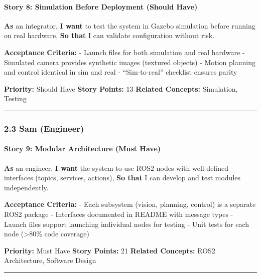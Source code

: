 \documentclass[
]{article}
\begin{document}
\hypertarget{story-8-simulation-before-deployment-should-have}{%
\paragraph{Story 8: Simulation Before Deployment (Should
Have)}\label{story-8-simulation-before-deployment-should-have}}

\textbf{As} an integrator, \textbf{I want} to test the system in Gazebo
simulation before running on real hardware, \textbf{So that} I can
validate configuration without risk.

\textbf{Acceptance Criteria:} - Launch files for both simulation and
real hardware - Simulated camera provides synthetic images (textured
objects) - Motion planning and control identical in sim and real -
``Sim-to-real'' checklist ensures parity

\textbf{Priority:} Should Have \textbf{Story Points:} 13 \textbf{Related
Concepts:} Simulation, Testing

\begin{center}\rule{0.5\linewidth}{0.5pt}\end{center}

\hypertarget{sam-engineer}{%
\subsubsection{2.3 Sam (Engineer)}\label{sam-engineer}}

\hypertarget{story-9-modular-architecture-must-have}{%
\paragraph{Story 9: Modular Architecture (Must
Have)}\label{story-9-modular-architecture-must-have}}

\textbf{As} an engineer, \textbf{I want} the system to use ROS2 nodes
with well-defined interfaces (topics, services, actions), \textbf{So
that} I can develop and test modules independently.

\textbf{Acceptance Criteria:} - Each subsystem (vision, planning,
control) is a separate ROS2 package - Interfaces documented in README
with message types - Launch files support launching individual nodes for
testing - Unit tests for each node (\textgreater80\% code coverage)

\textbf{Priority:} Must Have \textbf{Story Points:} 21 \textbf{Related
Concepts:} ROS2 Architecture, Software Design

\begin{center}\rule{0.5\linewidth}{0.5pt}\end{center}
\end{document}
